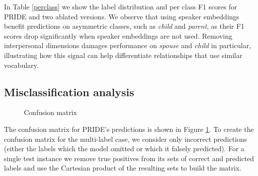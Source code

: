 In Table \ref{perclass} we show the label distribution and per class F1 scores for PRIDE and two ablated versions.
We observe that using speaker embeddings benefit predictions on asymmetric classes, such as \emph{child} and \emph{parent}, as their F1 scores drop significantly when speaker embeddings are not used. Removing interpersonal dimensions damages performance on \textit{spouse} and \textit{child} in particular, illustrating  how this signal can help differentiate relationships that use similar vocabulary.


\subsection{Misclassification analysis}

\begin{figure}[t!]
\centering
{}
\caption{Confusion matrix}
\label{confusion}
\end{figure}

The confusion matrix for PRIDE's predictions is shown in Figure \ref{confusion}. To create the confusion matrix for the multi-label case, we consider only incorrect predictions (either the labels which the model omitted or which it falsely predicted). For a single test instance we remove true positives from its sets of correct and predicted labels and use the Cartesian product of the resulting sets to build the matrix.

